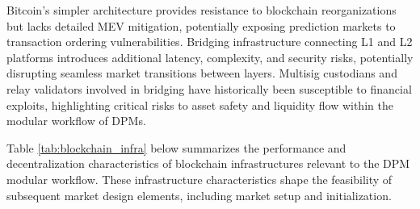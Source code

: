 {Bitcoin’s simpler architecture provides resistance to blockchain reorganizations but lacks detailed MEV mitigation, potentially exposing prediction markets to transaction ordering vulnerabilities. Bridging infrastructure connecting L1 and L2 platforms introduces additional latency, complexity, and security risks, potentially disrupting seamless market transitions between layers. Multisig custodians and relay validators involved in bridging have historically been susceptible to financial exploits, highlighting critical risks to asset safety and liquidity flow within the modular workflow of DPMs.

Table \ref{tab:blockchain_infra} below summarizes the performance and decentralization characteristics of blockchain infrastructures relevant to the DPM modular workflow. These infrastructure characteristics shape the feasibility of subsequent market design elements, including market setup and initialization.

}
